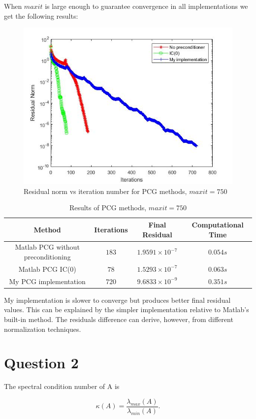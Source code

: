 \documentclass[a4paper, 11pt]{article}
\begin{document}
			When $ maxit $ is large enough to guarantee convergence in all implementations we get the following results:
			\begin{figure}[H]
				\centering
				\includegraphics[width=.6\linewidth]{ex1_it750.jpg}
				\caption{Residual norm vs iteration number for PCG methods, $maxit=750$}
				\label{fig:ex1_it750}
			\end{figure}
		
			\begin{table}[H]
				\centering
				\begin{tabular}{c|c|c|c}
					\textbf{Method} 					&  \textbf{Iterations} 	& \textbf{Final Residual} 		& \textbf{Computational Time} 	\\ \hline
					Matlab PCG without preconditioning	& 			$183$ 		& $ 1.9591 \times 10^{-7} $ 	& $ 0.054 s $					\\ \hline
					Matlab PCG IC(0)					& 			$78$ 		& $ 1.5293 \times 10^{-7} $ 	& $ 0.063 s $					\\ \hline	
					My PCG implementation				& 			$720$		& $ 9.6833 \times 10^{-9} $		& $	0.351 s $					\\
				\end{tabular}
				\caption{Results of PCG methods, $maxit=750$}
				\label{table:ex1_it750}
			\end{table}
			
			My implementation is slower to converge but produces better final residual values.
			This can be explained by the simpler implementation relative to Matlab's built-in method.
			The residuals difference can derive, however, from different normalization techniques.
			
			
		\section*{Question 2}
			The spectral condition number of A is 
			
			\begin{equation}
				\kappa(A) = \frac{\lambda_{max}(A)}{\lambda_{min}(A)}.
			\end{equation}
		
\end{document}
